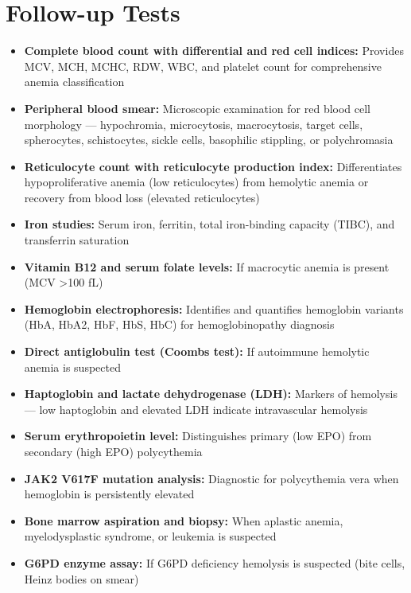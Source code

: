 \section*{Follow-up Tests}
\begin{itemize}
  \item \textbf{Complete blood count with differential and red cell indices:} Provides MCV, MCH, MCHC, RDW, WBC, and platelet count for comprehensive anemia classification
  \item \textbf{Peripheral blood smear:} Microscopic examination for red blood cell morphology --- hypochromia, microcytosis, macrocytosis, target cells, spherocytes, schistocytes, sickle cells, basophilic stippling, or polychromasia
  \item \textbf{Reticulocyte count with reticulocyte production index:} Differentiates hypoproliferative anemia (low reticulocytes) from hemolytic anemia or recovery from blood loss (elevated reticulocytes)
  \item \textbf{Iron studies:} Serum iron, ferritin, total iron-binding capacity (TIBC), and transferrin saturation
  \item \textbf{Vitamin B12 and serum folate levels:} If macrocytic anemia is present (MCV >100 fL)
  \item \textbf{Hemoglobin electrophoresis:} Identifies and quantifies hemoglobin variants (HbA, HbA2, HbF, HbS, HbC) for hemoglobinopathy diagnosis
  \item \textbf{Direct antiglobulin test (Coombs test):} If autoimmune hemolytic anemia is suspected
  \item \textbf{Haptoglobin and lactate dehydrogenase (LDH):} Markers of hemolysis --- low haptoglobin and elevated LDH indicate intravascular hemolysis
  \item \textbf{Serum erythropoietin level:} Distinguishes primary (low EPO) from secondary (high EPO) polycythemia
  \item \textbf{JAK2 V617F mutation analysis:} Diagnostic for polycythemia vera when hemoglobin is persistently elevated
  \item \textbf{Bone marrow aspiration and biopsy:} When aplastic anemia, myelodysplastic syndrome, or leukemia is suspected
  \item \textbf{G6PD enzyme assay:} If G6PD deficiency hemolysis is suspected (bite cells, Heinz bodies on smear)
\end{itemize}

